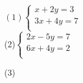 \documentclass[b4paper,16.5pt,paparesize, landscape]{ltjsarticle}%
\begin{document}
\begin{multicols*}{3}
\begin{enumerate}
\end{enumerate}
\vfill\null\columnbreak

$(1)\begin{cases}
			x + 2y  = 3\\
			3x + 4y = 7\\
\end{cases}$ 	\\[90mm]
(2)$\begin{cases}
			2x  - 5y = 7\\
			6x + 4y = 2\\
\end{cases}$


 \vfill\null\columnbreak
 \begin{itembox}[l]{(3)}
	 \vspace{25mm}
 \end{itembox}

\end{multicols*}
\end{document}
